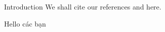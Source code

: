 \begin{frame}{Introduction}
    We shall cite our references \cite{ab54} and \cite{d92} here.
\end{frame}

\begin{frame}
    Hello các bạn
\end{frame}